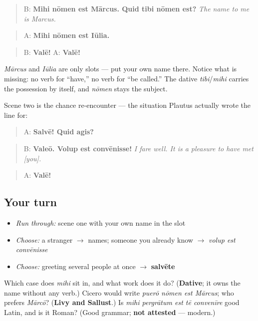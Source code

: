 \begin{quote}
B: \textbf{Mihi nōmen est Mārcus. Quid tibi nōmen est?} \emph{The name to me is Marcus.}
\end{quote}

\begin{quote}
A: \textbf{Mihi nōmen est Iūlia.}
\end{quote}

\begin{quote}
B: \textbf{Valē!}  A: \textbf{Valē!}
\end{quote}

\emph{Mārcus} and \emph{Iūlia} are only slots — put your own name there. Notice what is missing: no verb for \textquotedblleft{}have,\textquotedblright{} no verb for \textquotedblleft{}be called.\textquotedblright{} The dative \emph{tibi}/\emph{mihi} carries the possession by itself, and \emph{nōmen} stays the subject.

Scene two is the chance re-encounter — the situation Plautus actually wrote the line for:

\begin{quote}
A: \textbf{Salvē! Quid agis?}
\end{quote}

\begin{quote}
B: \textbf{Valeō. Volup est convēnisse!} \emph{I fare well. It is a pleasure to have met {[}you{]}.}
\end{quote}

\begin{quote}
A: \textbf{Valē!}
\end{quote}

\subsection*{Your turn}
\begin{itemize}
\raggedright
  \item \emph{Run through:} scene one with your own name in the slot
  \item \emph{Choose:} a stranger $\to$ names; someone you already know $\to$ \emph{volup est convēnisse}
  \item \emph{Choose:} greeting several people at once $\to$ \textbf{salvēte}
\end{itemize}

\begin{tcolorbox}[breakable,colback=teal!4,colframe=teal!35!black,title={Before you move on}]
Which case does \emph{mihi} sit in, and what work does it do? (\textbf{Dative}; it owns the name without any verb.) Cicero would write \emph{puerō nōmen est Mārcus}; who prefers \emph{Mārcō}? (\textbf{Livy and Sallust}.) Is \emph{mihi pergrātum est tē convenīre} good Latin, and is it Roman? (Good grammar; \textbf{not attested} — modern.)
\end{tcolorbox}
